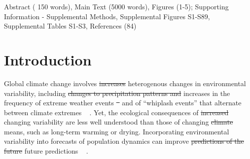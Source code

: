 \documentclass[lineno,sn-nature]{sn-jnl}%
\makeatletter
\providecommand{\DIFadd}[1]{{\protect\color{blue}#1}} %
\providecommand{\DIFdel}[1]{{\protect\color{red}\protect\scriptsize\sout{#1}}}
\def\filecountsname{This file contains}%
\def\filecounts#1{\ifx#1\empty\else\def\@filecounts{\par\addvspace{10pt}{\keywordfont{\bfseries\filecountsname:} #1\par}}\fi}%
\def\@filecounts{}%
\providecommand{\DIFadd}[1]{{\protect\color{blue}\uwave{#1}}} %
\providecommand{\DIFdel}[1]{{\protect\color{red}\sout{#1}}}                      %
\providecommand{\DIFaddbegin}{} %
\providecommand{\DIFaddend}{} %
\providecommand{\DIFdelbegin}{} %
\providecommand{\DIFdelend}{} %
\newcommand{\DIFscaledelfig}{0.5}
\newlength{\DIFdelgraphicswidth} %
\newlength{\DIFdelgraphicsheight} %
\newcommand{\DIFaddincludegraphics}[2][]{{\color{blue}\fbox{\DIFOincludegraphics[#1]{#2}}}} %
\newcommand{\DIFdelincludegraphics}[2][]{%
\sbox{\DIFdelgraphicsbox}{\DIFOincludegraphics[#1]{#2}}%
\settoboxwidth{\DIFdelgraphicswidth}{\DIFdelgraphicsbox} %
\settoboxtotalheight{\DIFdelgraphicsheight}{\DIFdelgraphicsbox} %
\scalebox{\DIFscaledelfig}{%
\parbox[b]{\DIFdelgraphicswidth}{\usebox{\DIFdelgraphicsbox}\\[-\baselineskip] \rule{\DIFdelgraphicswidth}{0em}}\llap{\resizebox{\DIFdelgraphicswidth}{\DIFdelgraphicsheight}{%
\setlength{\unitlength}{\DIFdelgraphicswidth}%
\begin{picture}(1,1)%
\thicklines\linethickness{2pt} %
{\color[rgb]{1,0,0}\put(0,0){\framebox(1,1){}}}%
{\color[rgb]{1,0,0}\put(0,0){\line( 1,1){1}}}%
{\color[rgb]{1,0,0}\put(0,1){\line(1,-1){1}}}%
\end{picture}%
}\hspace*{3pt}}} %
} %
\DeclareRobustCommand{\DIFaddbegin}{\DIFOaddbegin \let\includegraphics\DIFaddincludegraphics} %
\DeclareRobustCommand{\DIFaddend}{\DIFOaddend \let\includegraphics\DIFOincludegraphics} %
\DeclareRobustCommand{\DIFdelbegin}{\DIFOdelbegin \let\includegraphics\DIFdelincludegraphics} %
\DeclareRobustCommand{\DIFdelend}{\DIFOaddend \let\includegraphics\DIFOincludegraphics} %
\makeatother
\begin{document}
\DIFaddend 

	\DIFdelbegin %
\DIFdelend \DIFaddbegin \filecounts{Abstract ( 150 words), Main Text (5000 words), Figures (1-5); Supporting Information - Supplemental Methods, Supplemental Figures S1-S89, Supplemental Tables S1-S3, References (84)}
	
\DIFaddend 



	\maketitle




\section*{Introduction}
Global climate change involves \DIFdelbegin \DIFdel{increases }\DIFdelend \DIFaddbegin \DIFadd{heterogenous changes }\DIFaddend in environmental variability, including \DIFdelbegin \DIFdel{changes to precipitation patterns and }\DIFdelend \DIFaddbegin \DIFadd{increases in }\DIFaddend the frequency of extreme weather events \DIFdelbegin \DIFdel{\mbox{%
\cite{seneviratne2012changes, ipcc_2021}}\hspace{0pt}%
}\DIFdelend \DIFaddbegin \DIFadd{and of ``whiplash events'' that alternate between climate extremes \mbox{%
\cite{seneviratne2012changes, bathiany2018climate,swain2018increasing,ipcc_2021}}\hspace{0pt}%
}\DIFaddend .
Yet, the ecological consequences of \DIFdelbegin \DIFdel{increased }\DIFdelend \DIFaddbegin \DIFadd{changing }\DIFaddend variability are less well understood than those of changing \DIFdelbegin \DIFdel{climate }\DIFdelend means, such as long-term warming or drying. 
Incorporating environmental variability into forecasts of population dynamics can improve \DIFdelbegin \DIFdel{predictions of the future }\DIFdelend \DIFaddbegin \DIFadd{future predictions \mbox{%
\cite{clark2005environmental}}\hspace{0pt}%
}\DIFaddend .
\end{document}
